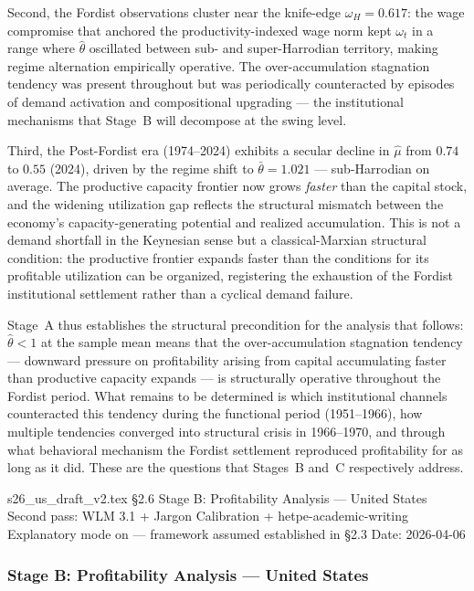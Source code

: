 \documentclass[11pt,a4paper]{article}
\begin{document}
{Second, the Fordist observations cluster near the knife-edge $\omega_H =
0.617$: the wage compromise that anchored the productivity-indexed wage
norm kept $\omega_t$ in a range where $\hat{\theta}$ oscillated between
sub- and super-Harrodian territory, making regime alternation empirically
operative. The over-accumulation stagnation tendency was present throughout
but was periodically counteracted by episodes of demand activation and
compositional upgrading --- the institutional mechanisms that Stage~B will
decompose at the swing level.

Third, the Post-Fordist era (1974--2024) exhibits a secular decline in
$\hat{\mu}$ from $0.74$ to $0.55$ (2024), driven by the regime shift to
$\bar{\theta} = 1.021$ --- sub-Harrodian on average. The productive
capacity frontier now grows \emph{faster} than the capital stock, and
the widening utilization gap reflects the structural mismatch between
the economy's capacity-generating potential and realized accumulation.
This is not a demand shortfall in the Keynesian sense but a
classical-Marxian structural condition: the productive frontier expands
faster than the conditions for its profitable utilization can be organized,
registering the exhaustion of the Fordist institutional settlement rather
than a cyclical demand failure.

Stage~A thus establishes the structural precondition for the analysis that
follows: $\hat{\theta} < 1$ at the sample mean means that the
over-accumulation stagnation tendency --- downward pressure on
profitability arising from capital accumulating faster than productive
capacity expands --- is structurally operative throughout the Fordist
period. What remains to be determined is which institutional channels
counteracted this tendency during the functional period (1951--1966), how
multiple tendencies converged into structural crisis in 1966--1970, and
through what behavioral mechanism the Fordist settlement reproduced
profitability for as long as it did. These are the questions that
Stages~B and~C respectively address.




 s26_us_draft_v2.tex
 §2.6 Stage B: Profitability Analysis — United States
 Second pass: WLM 3.1 + Jargon Calibration + hetpe-academic-writing
 Explanatory mode on — framework assumed established in §2.3
 Date: 2026-04-06



\subsubsection{Stage B: Profitability Analysis --- United States}
\label{sssec:stageB_us}

}
\end{document}
